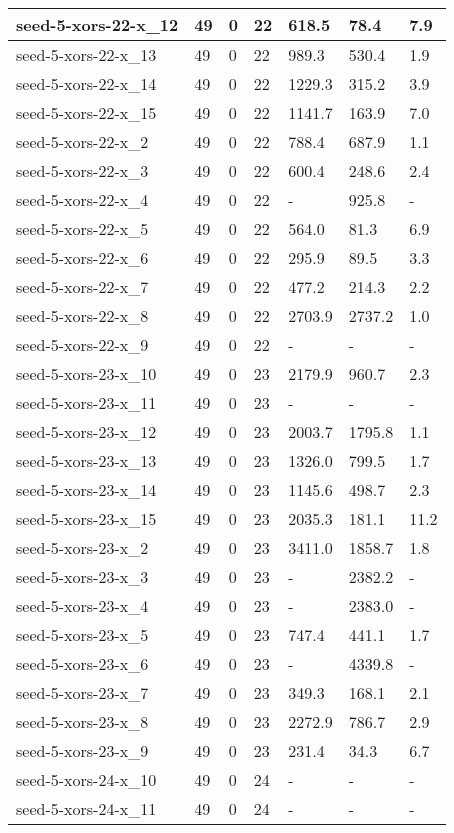 \begin{scriptsize}
\begin{longtable}{|p{5cm}|l|l|l|l|l|l|}
seed-5-xors-22-x\_12&49&0&22&618.5&78.4&7.9 \\ \hline 
seed-5-xors-22-x\_13&49&0&22&989.3&530.4&1.9 \\ \hline 
seed-5-xors-22-x\_14&49&0&22&1229.3&315.2&3.9 \\ \hline 
seed-5-xors-22-x\_15&49&0&22&1141.7&163.9&7.0 \\ \hline 
seed-5-xors-22-x\_2&49&0&22&788.4&687.9&1.1 \\ \hline 
seed-5-xors-22-x\_3&49&0&22&600.4&248.6&2.4 \\ \hline 
seed-5-xors-22-x\_4&49&0&22&-&925.8&- \\ \hline 
seed-5-xors-22-x\_5&49&0&22&564.0&81.3&6.9 \\ \hline 
seed-5-xors-22-x\_6&49&0&22&295.9&89.5&3.3 \\ \hline 
seed-5-xors-22-x\_7&49&0&22&477.2&214.3&2.2 \\ \hline 
seed-5-xors-22-x\_8&49&0&22&2703.9&2737.2&1.0 \\ \hline 
seed-5-xors-22-x\_9&49&0&22&-&-&- \\ \hline 
seed-5-xors-23-x\_10&49&0&23&2179.9&960.7&2.3 \\ \hline 
seed-5-xors-23-x\_11&49&0&23&-&-&- \\ \hline 
seed-5-xors-23-x\_12&49&0&23&2003.7&1795.8&1.1 \\ \hline 
seed-5-xors-23-x\_13&49&0&23&1326.0&799.5&1.7 \\ \hline 
seed-5-xors-23-x\_14&49&0&23&1145.6&498.7&2.3 \\ \hline 
seed-5-xors-23-x\_15&49&0&23&2035.3&181.1&11.2 \\ \hline 
seed-5-xors-23-x\_2&49&0&23&3411.0&1858.7&1.8 \\ \hline 
seed-5-xors-23-x\_3&49&0&23&-&2382.2&- \\ \hline 
seed-5-xors-23-x\_4&49&0&23&-&2383.0&- \\ \hline 
seed-5-xors-23-x\_5&49&0&23&747.4&441.1&1.7 \\ \hline 
seed-5-xors-23-x\_6&49&0&23&-&4339.8&- \\ \hline 
seed-5-xors-23-x\_7&49&0&23&349.3&168.1&2.1 \\ \hline 
seed-5-xors-23-x\_8&49&0&23&2272.9&786.7&2.9 \\ \hline 
seed-5-xors-23-x\_9&49&0&23&231.4&34.3&6.7 \\ \hline 
seed-5-xors-24-x\_10&49&0&24&-&-&- \\ \hline 
seed-5-xors-24-x\_11&49&0&24&-&-&- \\ \hline 

\end{longtable}
\end{scriptsize}
